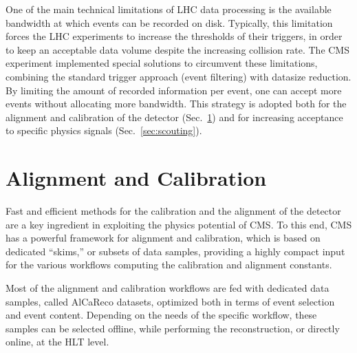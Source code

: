 One of the main technical limitations of LHC data processing is the available bandwidth at which events can be
recorded on disk. Typically, this limitation forces the LHC experiments to increase the thresholds of their
triggers, in order to keep an acceptable data volume despite the
increasing collision rate.  The CMS experiment implemented special
solutions to circumvent these limitations, combining the standard
trigger approach (event filtering) with datasize reduction. By
limiting the amount of recorded information per event, one can accept
more events without allocating more bandwidth. This strategy is
adopted both for the alignment and calibration of the detector
(Sec.~\ref{sec:alca}) and for increasing acceptance to specific
physics signals (Sec.~\ref{sec:scouting}).


\section{Alignment and Calibration}
\label{sec:alca}

Fast and efficient methods for the calibration and the alignment of
the detector are a key ingredient in exploiting the physics potential of
CMS. To this end, CMS has a powerful framework for alignment and
calibration, which is based on dedicated ``skims,'' or subsets of data samples, providing a highly
compact input for the various workflows computing the
calibration and alignment constants. 

Most of the alignment and calibration workflows are fed with dedicated
data samples, called AlCaReco datasets, optimized both in terms of event
selection and event content. Depending on the needs of the specific
workflow, these samples can be selected offline, while performing the
reconstruction, or directly online, at the HLT level. 

